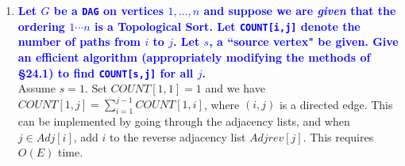 \documentclass[11pt]{article}
\begin{document}
\begin{enumerate}
\item \textbf{\textcolor{blue}{Let $G$ be a {\tt DAG} on vertices $1,\ldots,n$ and suppose we are {\em given} that the ordering $1\cdots n$ is
a Topological Sort. Let {\tt COUNT[i,j]} denote the number of paths from $i$ to $j$.  Let $s$, a ``source vertex" be given. Give an efficient algorithm (appropriately modifying the methods of \S 24.1) to find {\tt COUNT[s,j]} for all $j$.}}
    \\ Assume $s = 1$. Set $COUNT[1, 1] = 1$ and we have $COUNT[1, j] = \sum_{i=1}^{j-1} COUNT[1,i]$, where $(i,j)$ is a directed edge. This can be implemented by going through the adjacency lists, and when $j \in Adj[i]$, add $i$ to the reverse adjacency list $Adjrev[j]$. This requires $O(E)$ time.
\end{enumerate}
\end{document}
